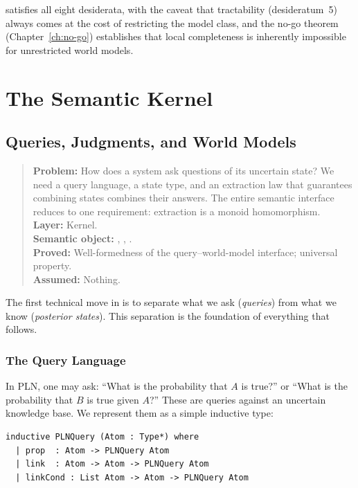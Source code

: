 \documentclass[11pt,openany]{report}
\begin{document}
\xiPLN{} satisfies all eight desiderata, with the caveat that tractability
(desideratum~5) always comes at the cost of restricting the model class, and
the no-go theorem (Chapter~\ref{ch:no-go}) establishes that local
completeness is inherently impossible for unrestricted world models.


\part{The Semantic Kernel}
\label{part:kernel}

\chapter{Queries, Judgments, and World Models}
\label{ch:queries}

\begin{quote}\small
\textbf{Problem:} How does a system ask questions of its uncertain state?
We need a query language, a state type, and an extraction law that
guarantees combining states combines their answers.  The entire semantic
interface reduces to one requirement: extraction is a monoid homomorphism.\\[4pt]
\textbf{Layer:} Kernel.\\
\textbf{Semantic object:} \PLNQuery{}, \WorldModel{}, \WorldModelSigma{}.\\
\textbf{Proved:} Well-formedness of the query--world-model interface; universal property.\\
\textbf{Assumed:} Nothing.
\end{quote}

The first technical move in \xiPLN{} is to separate what we ask
(\emph{queries}) from what we know (\emph{posterior states}).  This
separation is the foundation of everything that follows.

\section{The Query Language}

In PLN, one may ask: ``What is the probability that $A$ is true?''
or ``What is the probability that $B$ is true given $A$?''  These are
queries against an uncertain knowledge base.  We represent them as a
simple inductive type:

\begin{lstlisting}
inductive PLNQuery (Atom : Type*) where
  | prop  : Atom -> PLNQuery Atom
  | link  : Atom -> Atom -> PLNQuery Atom
  | linkCond : List Atom -> Atom -> PLNQuery Atom
\end{lstlisting}
\end{document}
